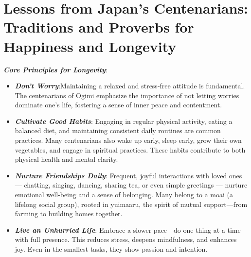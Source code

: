 \section*{Lessons from Japan's Centenarians: Traditions and Proverbs for Happiness and Longevity}
\textbf{\textit{Core Principles for Longevity}}:
\begin{itemize}
    \item \textbf{\textit{Don't Worry}}:Maintaining a relaxed and stress-free attitude is fundamental. The centenarians of Ogimi emphasize the importance of not letting worries dominate one's life, fostering a sense of inner peace and contentment.
    \item \textbf{\textit{Cultivate Good Habits}}: Engaging in regular physical activity, eating a balanced diet, and maintaining consistent daily routines are common practices. Many centenarians also wake up early, sleep early, grow their own vegetables, and engage in spiritual practices. These habits contribute to both physical health and mental clarity.
    \item \textbf{\textit{Nurture Friendships Daily}}: Frequent, joyful interactions with loved ones — chatting, singing, dancing, sharing tea, or even simple greetings — nurture emotional well-being and a sense of belonging. Many belong to a moai (a lifelong social group), rooted in yuimaaru, the spirit of mutual support—from farming to building homes together.
    \item \textbf{\textit{Live an Unhurried Life}}: Embrace a slower pace—do one thing at a time with full presence. This reduces stress, deepens mindfulness, and enhances joy. Even in the smallest tasks, they show passion and intention.
\end{itemize}
